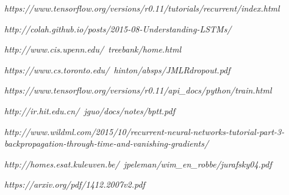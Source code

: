 \documentclass[10pt,a4paper,titlepage]{article}
\begin{document}
\newpage
{}
\begin{thebibliography}{9}
	
	\textit{https://www.tensorflow.org/versions/r0.11/tutorials/recurrent/index.html}
	
	\textit{http://colah.github.io/posts/2015-08-Understanding-LSTMs/}
	
	\textit{http://www.cis.upenn.edu/~treebank/home.html}
	
	\textit{https://www.cs.toronto.edu/~hinton/absps/JMLRdropout.pdf}
	
	\textit{https://www.tensorflow.org/versions/r0.11/api\_docs/python/train.html}
	
	\textit{http://ir.hit.edu.cn/~jguo/docs/notes/bptt.pdf}
	
	\textit{http://www.wildml.com/2015/10/recurrent-neural-networks-tutorial-part-3-backpropagation-through-time-and-vanishing-gradients/}
	
	\textit{http://homes.esat.kuleuven.be/~jpeleman/wim\_en\_robbe/jurafsky04.pdf}
	
	\textit{https://arxiv.org/pdf/1412.2007v2.pdf}
	
\end{thebibliography}
	
\end{document}
